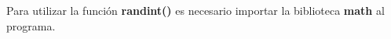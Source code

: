 
\question \tf[F] Para utilizar la función \textbf{randint()} es necesario
          importar la biblioteca \textbf{math} al programa.
